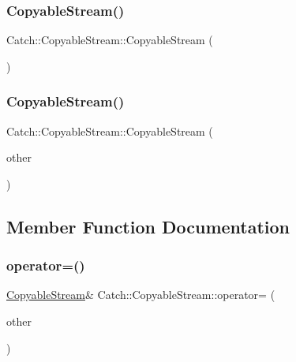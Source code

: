 \subsubsection{\texorpdfstring{Copyable\+Stream()}{CopyableStream()}\hspace{0.1cm}{\footnotesize\ttfamily [1/2]}}
{\footnotesize\ttfamily Catch\+::\+Copyable\+Stream\+::\+Copyable\+Stream (\begin{DoxyParamCaption}{ }\end{DoxyParamCaption})\hspace{0.3cm}{\ttfamily [inline]}}

\mbox{\label{struct_catch_1_1_copyable_stream_a0e72dc16240653f52c17106f4bf34da8}} 
\subsubsection{\texorpdfstring{Copyable\+Stream()}{CopyableStream()}\hspace{0.1cm}{\footnotesize\ttfamily [2/2]}}
{\footnotesize\ttfamily Catch\+::\+Copyable\+Stream\+::\+Copyable\+Stream (\begin{DoxyParamCaption}\item[{\mbox{\hyperlink{struct_catch_1_1_copyable_stream}{Copyable\+Stream}} const \&}]{other }\end{DoxyParamCaption})\hspace{0.3cm}{\ttfamily [inline]}}



\subsection{Member Function Documentation}
\mbox{\label{struct_catch_1_1_copyable_stream_a1760fa29b38011c5845171260bec0966}} 
\subsubsection{\texorpdfstring{operator=()}{operator=()}}
{\footnotesize\ttfamily \mbox{\hyperlink{struct_catch_1_1_copyable_stream}{Copyable\+Stream}}\& Catch\+::\+Copyable\+Stream\+::operator= (\begin{DoxyParamCaption}\item[{\mbox{\hyperlink{struct_catch_1_1_copyable_stream}{Copyable\+Stream}} const \&}]{other }\end{DoxyParamCaption})\hspace{0.3cm}{\ttfamily [inline]}}



